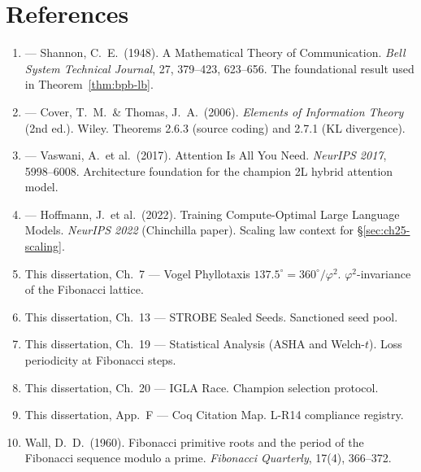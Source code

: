 \section{References}
\label{sec:ch25-references}

\begin{enumerate}
\item {} ---
  Shannon, C.\ E.\ (1948). A Mathematical Theory of Communication.
  \emph{Bell System Technical Journal}, 27, 379--423, 623--656.
  The foundational result used in Theorem~\ref{thm:bpb-lb}.

\item {} ---
  Cover, T.\ M.\ \& Thomas, J.\ A.\ (2006).
  \emph{Elements of Information Theory} (2nd ed.).  Wiley.
  Theorems 2.6.3 (source coding) and 2.7.1 (KL divergence).

\item {} ---
  Vaswani, A.\ et al.\ (2017). Attention Is All You Need.
  \emph{NeurIPS 2017}, 5998--6008.
  Architecture foundation for the champion 2L hybrid attention model.

\item {} ---
  Hoffmann, J.\ et al.\ (2022). Training Compute-Optimal Large Language
  Models.  \emph{NeurIPS 2022} (Chinchilla paper).
  Scaling law context for §\ref{sec:ch25-scaling}.

\item This dissertation, Ch.~7 ---
  Vogel Phyllotaxis $137.5^\circ = 360^\circ/\varphi^2$.
  $\varphi^2$-invariance of the Fibonacci lattice.

\item This dissertation, Ch.~13 ---
  STROBE Sealed Seeds.  Sanctioned seed pool.

\item This dissertation, Ch.~19 ---
  Statistical Analysis (ASHA and Welch-$t$).
  Loss periodicity at Fibonacci steps.

\item This dissertation, Ch.~20 ---
  IGLA Race.  Champion selection protocol.

\item This dissertation, App.~F ---
  Coq Citation Map.  L-R14 compliance registry.

\item Wall, D.\ D.\ (1960). Fibonacci primitive roots and the period
  of the Fibonacci sequence modulo a prime.
  \emph{Fibonacci Quarterly}, 17(4), 366--372.


\end{enumerate}
